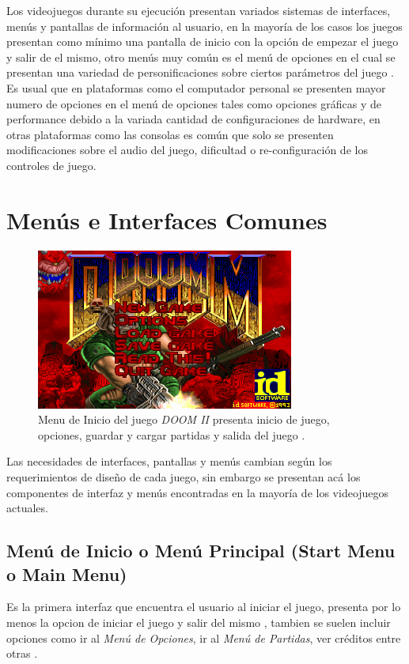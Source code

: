 Los videojuegos durante su ejecución presentan variados sistemas de interfaces, menús y pantallas de información al usuario, en la mayoría de los casos los juegos presentan como mínimo una pantalla de inicio con la opción de empezar el juego y salir de el mismo, otro menús muy común es el menú de  opciones en el cual se presentan una variedad de personificaciones sobre ciertos parámetros del juego \cite{gb_optionsmenu}. Es usual que en plataformas como el computador personal se presenten mayor numero de opciones en el menú de opciones tales como opciones gráficas y de performance debido a la variada cantidad de configuraciones de hardware, en otras plataformas como las consolas es común que solo se presenten modificaciones sobre el audio del juego, dificultad o re-configuración de los controles de juego.

\section{Menús e Interfaces Comunes}
\setlength\intextsep{0pt}
\begin{figure}
\includegraphics[width=\linewidth]{media/doom_start.png}
\caption{Menu de Inicio del juego \emph{DOOM II} presenta inicio de juego, opciones, guardar y cargar partidas y salida del juego \cite{doomii}.}
\label{fig:doom}
\end{figure}
Las necesidades de interfaces, pantallas y menús cambian según los requerimientos de diseño de cada juego, sin embargo se presentan acá los componentes de interfaz y menús encontradas en la mayoría de los videojuegos actuales.
\subsection{Menú de Inicio o Menú Principal (Start Menu o Main Menu)}
Es la primera interfaz que encuentra el usuario al iniciar el juego, presenta por lo menos la opcion de iniciar el juego y salir del mismo \cite[p.~28]{jenkinscreatinggames}, tambien se suelen incluir opciones como ir al \emph{Menú de Opciones}, ir al \emph{Menú de Partidas}, ver créditos entre otras \cite{mainmenu}.~\\


